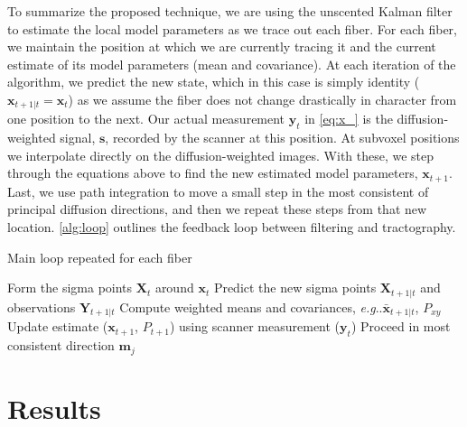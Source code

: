 \documentclass[final,hyperref]{gatech-thesis}
\makeatletter
\renewcommand{\v}[1]{\ensuremath{\mathbf #1}\xspace}
\DeclareRobustCommand\onedot{\futurelet\@let@token\@onedot}
\def\@onedot{\ifx\@let@token.\else.\null\fi\xspace}
\newcommand{\eg}{\textit{e.g}\onedot}
\newcommand{\s}{\v s}
\newcommand{\m}{\v m}
\newcommand{\x}{\v x}
\newcommand{\y}{\v y}
\newcommand{\X}{\v X}
\newcommand{\Y}{\v Y}
\makeatother
\begin{document}
To summarize the proposed technique, we are using the unscented Kalman filter
to estimate the local model parameters as we trace out each fiber.  For each
fiber, we maintain the position at which we are currently tracing it and the
current estimate of its model parameters (mean and covariance).  At each
iteration of the algorithm, we predict the new state, which in this case is
simply identity ($\x_{t+1|t}=\x_t$) as we assume the fiber does not change
drastically in character from one position to the next.  Our actual
measurement $\y_t$ in \autoref{eq:x_} is the diffusion-weighted signal, \s,
recorded by the scanner at this position.  At subvoxel positions we
interpolate directly on the diffusion-weighted images.  With these, we step
through the equations above to find the new estimated model parameters,
$\x_{t+1}$.  Last, we use path integration to move a small step in the most
consistent of principal diffusion directions, and then we repeat these steps
from that new location.  \autoref{alg:loop} outlines the feedback loop between
filtering and tractography.
\begin{algorithm}[t]
  \setlength\abovedisplayskip{2pt}
  \setlength\belowdisplayskip{2pt}
  \caption{Main loop repeated for each fiber}
  \label{alg:loop}
  \begin{algorithmic}[1]
    \REPEAT
      \STATE Form the sigma points $\X_t$ around $\x_t$
      \STATE Predict the new sigma points $\X_{t+1|t}$ and observations
      $\Y_{t+1|t}$
      \STATE Compute weighted means and covariances, \eg $\bar{\x}_{t+1|t}$, $P_{xy}$
      \STATE Update estimate ($\x_{t+1}$, $P_{t+1}$) using scanner
      measurement ($\y_t$)
      \STATE Proceed in most consistent direction $\m_j$
  \end{algorithmic}
\end{algorithm}






\chapter{Results}
\end{document}
